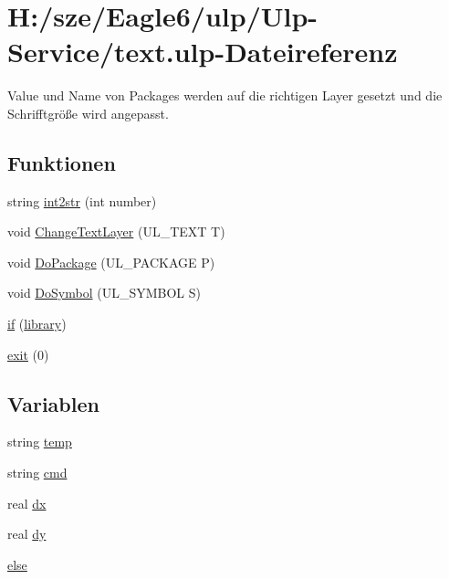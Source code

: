 \hypertarget{text_8ulp}{}\section{H\+:/sze/\+Eagle6/ulp/\+Ulp-\/\+Service/text.ulp-\/\+Dateireferenz}
\label{text_8ulp}


Value und Name von Packages werden auf die richtigen Layer gesetzt und die Schrifftgröße wird angepasst.  


\subsection*{Funktionen}
\begin{DoxyCompactItemize}
\item 
string \hyperlink{text_8ulp_aabffd2ab08d259550d4750cfa9c249dc}{int2str} (int number)
\item 
void \hyperlink{text_8ulp_a5c49580ff8392d09d647b4c71798660c}{Change\+Text\+Layer} (U\+L\+\_\+\+T\+E\+X\+T T)
\item 
void \hyperlink{text_8ulp_a16c4f624d844f5528ea6074c3a1bfdd5}{Do\+Package} (U\+L\+\_\+\+P\+A\+C\+K\+A\+G\+E P)
\item 
void \hyperlink{text_8ulp_ac99d3e554f6c09623323bbd292876bcb}{Do\+Symbol} (U\+L\+\_\+\+S\+Y\+M\+B\+O\+L S)
\item 
\hyperlink{text_8ulp_af88a82e52b69cec40b10d164bc6dc746}{if} (\hyperlink{uebersicht_8ulp_a825a5a33f9ea1598f17dac249716ae7e}{library})
\item 
\hyperlink{text_8ulp_adf5c804dfce7a70e36dda02995fad481}{exit} (0)
\end{DoxyCompactItemize}
\subsection*{Variablen}
\begin{DoxyCompactItemize}
\item 
string \hyperlink{text_8ulp_a57c52213e1c32a667a5963a122e0a23b}{temp}
\item 
string \hyperlink{text_8ulp_a90e155eddac72ef87020b85a704d97be}{cmd}
\item 
real \hyperlink{text_8ulp_a977a1936eb0c42c0dc8befdd36c402db}{dx}
\item 
real \hyperlink{text_8ulp_a5e9a2bb87d9944b591c7b364e25eabb6}{dy}
\item 
\hyperlink{text_8ulp_a0544c3fe466e421738dae463968b70ba}{else}
\end{DoxyCompactItemize}


